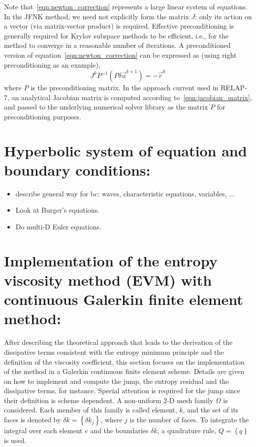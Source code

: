 Note that~\eqref{eqn:newton_correction} represents a large
linear system of equations.  In the JFNK method, we need not
explicitly form the matrix $J$: only its action on a vector
(via matrix-vector product) is required.
Effective preconditioning is generally required for Krylov subspace
methods to be efficient, i.e., for the method to converge in a
reasonable number of iterations. A preconditioned version of
equation~\eqref{eqn:newton_correction} can be expressed as (using
right preconditioning as an example),
\begin{equation}
  \label{eqn:newton_correction_preconditioned}
  J^k P^{-1} \left(P \delta \vec{u}^{k+1} \right)= -\vec{r}^k
\end{equation}
where $P$ is the preconditioning matrix. In the approach current
used in RELAP-7, an analytical Jacobian matrix is computed according
to~\eqref{eqn:jacobian_matrix}, and passed to the underlying numerical solver
library as the matrix $P$ for preconditioning purposes.
\section{Hyperbolic system of equation and boundary conditions:}
\begin{itemize}
\item describe general way for bc: waves, characteristic equations, variables, ...
\item Look at Burger's equations.
\item Do multi-D Euler equations.
\end{itemize}
\section{Implementation of the entropy viscosity method (EVM) with continuous Galerkin finite element method:}\label{sect:ev_impl_sect2}
After describing the theoretical approach that leads to the derivation of the dissipative terms consistent with the entropy minimum principle and the definition of the viscosity coefficient, this section focuses on the implementation of the method in a Galerkin continuous finite element scheme. Details are given on how to implement and compute the jump, the entropy residual and the dissipative terms, for instance. Special attention is required for the jump since their definition is scheme dependent. A non-uniform $2$-D mesh family $\Omega$ is considered. Each member of this family is called element, $k$, and the set of its faces is denoted by $\delta k = \left\{ \delta k_j \right\}$, where $j$ is the number of faces. To integrate the integral over each element $e$ and the boundaries $\delta k$, a quadrature rule, $Q = \left\{ q \right\}$ is used.

